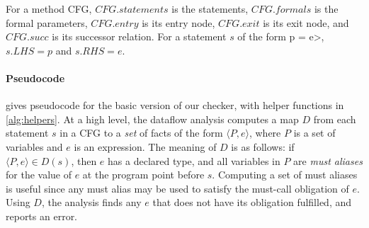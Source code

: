 
For a method CFG, $\mathit{CFG.statements}$ is the statements,
$\mathit{CFG.formals}$ is the formal parameters,
$\mathit{CFG.entry}$ is its entry node,
$\mathit{CFG.exit}$ is its exit node, and
$\mathit{CFG.succ}$ is its successor relation.
For a statement
$s$ of the form \<p = e>, $s.LHS = p$ and $s.RHS = e$.

\paragraph{Pseudocode}  gives pseudocode for the
basic version of our checker, with helper functions in \cref{alg:helpers}.  At a
high level, the dataflow analysis computes a map $D$ from each statement $s$ in
a CFG to a \emph{set} of facts of the form $\langle P, e \rangle$, where $P$ is
a set of variables and $e$ is an expression.  The meaning
of $D$ is as follows: if $\langle P, e \rangle
\in D(s)$, then $e$ has a declared \MustCall type, and all variables in $P$
are \emph{must aliases} for the value of $e$ at the program point before $s$.
Computing a set of must aliases is useful since any must alias may be used to
satisfy the must-call obligation of $e$.  Using $D$, the analysis finds any $e$
that does not have its \MustCall obligation fulfilled, and reports an error.

